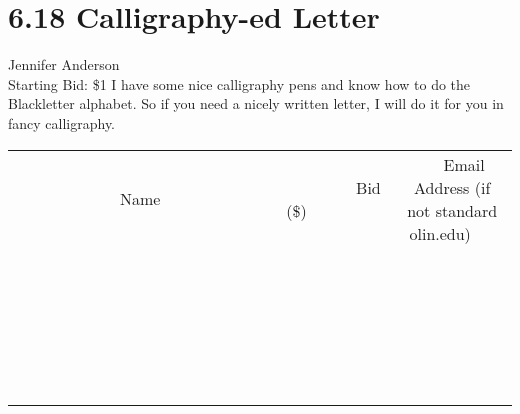 \documentclass[11pt]{article}
\begin{document}
\section*{6.18 Calligraphy-ed Letter}
Jennifer Anderson
\\
Starting Bid: \$1
\newline
I have some nice calligraphy pens and know how to do the Blackletter alphabet. So if you need a nicely written letter, I will do it for you in fancy calligraphy.
\\[6ex]
\begin{tabular}{c c c}
~~~~~~~~~~~~~Name~~~~~~~~~~~~~ & ~~~~~~~~~Bid (\$)~~~~~~~~~  & ~~~Email Address (if not standard olin.edu)~~~\\
 & & \\
\hline
 & & \\
\hline
 & & \\
\hline
 & & \\
\hline
 & & \\
\hline
 & & \\
\hline
 & & \\
\hline
 & & \\
\hline
 & & \\
\hline
 & & \\
\hline
 & & \\
\hline
 & & \\
\hline
 & & \\
\hline
 & & \\
\hline
 & & \\
\hline
 & & \\
\hline
 & & \\
\hline
 & & \\
\hline
 & & \\
\hline
 & & \\
\hline
 & & \\
\hline
 & & \\
\hline
 & & \\
\hline
 & & \\
\hline
 & & \\
\hline
 & & \\
\hline
\end{tabular}
\newpage
\end{document}

